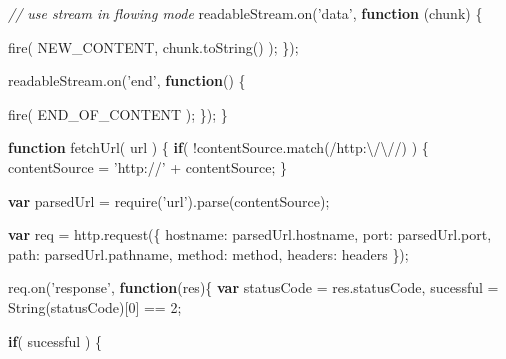 \documentclass[]{article}
\newenvironment{Shaded}{}{}
\newcommand{\KeywordTok}[1]{\textcolor[rgb]{0.00,0.44,0.13}{\textbf{{#1}}}}
\newcommand{\DataTypeTok}[1]{\textcolor[rgb]{0.56,0.13,0.00}{{#1}}}
\newcommand{\DecValTok}[1]{\textcolor[rgb]{0.25,0.63,0.44}{{#1}}}
\newcommand{\FloatTok}[1]{\textcolor[rgb]{0.25,0.63,0.44}{{#1}}}
\newcommand{\StringTok}[1]{\textcolor[rgb]{0.25,0.44,0.63}{{#1}}}
\newcommand{\CommentTok}[1]{\textcolor[rgb]{0.38,0.63,0.69}{\textit{{#1}}}}
\newcommand{\OtherTok}[1]{\textcolor[rgb]{0.00,0.44,0.13}{{#1}}}
\newcommand{\FunctionTok}[1]{\textcolor[rgb]{0.02,0.16,0.49}{{#1}}}
\newcommand{\NormalTok}[1]{{#1}}
\begin{document}
\begin{Shaded}
\begin{Highlighting}[]
      \CommentTok{// use stream in flowing mode   }
      \OtherTok{readableStream}\NormalTok{.}\FunctionTok{on}\NormalTok{(}\StringTok{'data'}\NormalTok{, }\KeywordTok{function} \NormalTok{(chunk) \{}
                                             
         \FunctionTok{fire}\NormalTok{( NEW_CONTENT, }\OtherTok{chunk}\NormalTok{.}\FunctionTok{toString}\NormalTok{() );}
      \NormalTok{\});}
      
      \OtherTok{readableStream}\NormalTok{.}\FunctionTok{on}\NormalTok{(}\StringTok{'end'}\NormalTok{, }\KeywordTok{function}\NormalTok{() \{}
               
         \FunctionTok{fire}\NormalTok{( END_OF_CONTENT );}
      \NormalTok{\});}
   \NormalTok{\}}
   
   \KeywordTok{function} \FunctionTok{fetchUrl}\NormalTok{( url ) \{}
      \KeywordTok{if}\NormalTok{( !}\OtherTok{contentSource}\NormalTok{.}\FunctionTok{match}\NormalTok{(}\OtherTok{/http:}\FloatTok{\textbackslash{}/\textbackslash{}/}\OtherTok{/}\NormalTok{) ) \{}
         \NormalTok{contentSource = }\StringTok{'http://'} \NormalTok{+ contentSource;}
      \NormalTok{\}                           }
                           
      \KeywordTok{var} \NormalTok{parsedUrl = }\FunctionTok{require}\NormalTok{(}\StringTok{'url'}\NormalTok{).}\FunctionTok{parse}\NormalTok{(contentSource); }
   
      \KeywordTok{var} \NormalTok{req = }\OtherTok{http}\NormalTok{.}\FunctionTok{request}\NormalTok{(\{}
         \DataTypeTok{hostname}\NormalTok{: }\OtherTok{parsedUrl}\NormalTok{.}\FunctionTok{hostname}\NormalTok{,}
         \DataTypeTok{port}\NormalTok{: }\OtherTok{parsedUrl}\NormalTok{.}\FunctionTok{port}\NormalTok{, }
         \DataTypeTok{path}\NormalTok{: }\OtherTok{parsedUrl}\NormalTok{.}\FunctionTok{pathname}\NormalTok{,}
         \DataTypeTok{method}\NormalTok{: method,}
         \DataTypeTok{headers}\NormalTok{: headers }
      \NormalTok{\});}
      
      \OtherTok{req}\NormalTok{.}\FunctionTok{on}\NormalTok{(}\StringTok{'response'}\NormalTok{, }\KeywordTok{function}\NormalTok{(res)\{}
         \KeywordTok{var} \NormalTok{statusCode = }\OtherTok{res}\NormalTok{.}\FunctionTok{statusCode}\NormalTok{,}
             \NormalTok{sucessful = }\FunctionTok{String}\NormalTok{(statusCode)[}\DecValTok{0}\NormalTok{] == }\DecValTok{2}\NormalTok{;}
                                
         \KeywordTok{if}\NormalTok{( sucessful ) \{          }
               

\end{Highlighting}
\end{Shaded}
\end{document}
